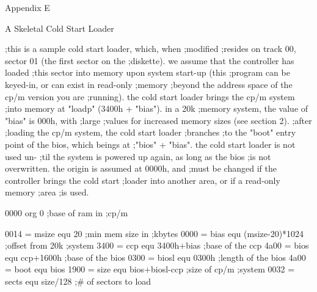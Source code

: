                                         Appendix E

                               A Skeletal Cold Start Loader



                                  ;this is a sample cold start loader, which, when
                                  ;modified
                                  ;resides on track 00, sector 01 (the first sector on the
                                  ;diskette). we assume that the controller has loaded
                                  ;this sector into memory upon system start-up (this
                                  ;program can be keyed-in, or can exist in read-only
                                  ;memory
                                  ;beyond the address space of the cp/m version you are
                                  ;running). the cold start loader brings the cp/m system
                                  ;into memory at "loadp" (3400h + "bias"). in a 20k
                                  ;memory system, the value of "bias" is 000h, with
                                  ;large
                                  ;values for increased memory sizes (see section 2).
                                  ;after
                                  ;loading the cp/m system, the cold start loader
                                  ;branches
                                  ;to the "boot" entry point of the bios, which beings at
                                  ;"bios" + "bias". the cold start loader is not used un-
                                  ;til the system is powered up again, as long as the bios
                                  ;is not overwritten. the origin is assumed at 0000h, and
                                  ;must be changed if the controller brings the cold start
                                  ;loader into another area, or if a read-only memory
                                  ;area
                                  ;is used.

0000                                        org 0                  ;base of ram in
                                                                   ;cp/m

0014 =                            msize     equ 20                 ;min mem size in
                                                                   ;kbytes
0000 =                            bias      equ (msize-20)*1024    ;offset from 20k
                                                                   ;system
3400 =                            ccp       equ 3400h+bias         ;base of the ccp
4a00 =                            bios      equ ccp+1600h          ;base of the bios
0300 =                            biosl     equ 0300h              ;length of the bios
4a00 =                            boot      equ bios  
1900 =                            size      equ bios+biosl-ccp     ;size of cp/m
                                                                   ;system
0032 =                            sects     equ size/128           ;# of sectors to load

